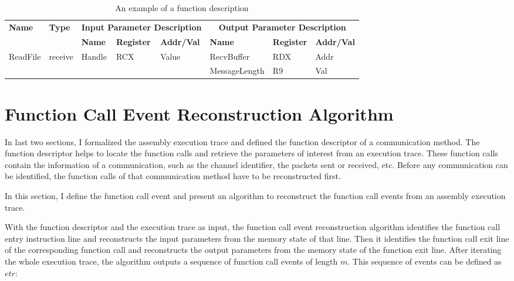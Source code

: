 \begin{table}[H]
        \centering
        \caption{An example of a function description}
        \label{functionexample}
        \begin{tabular}{|l|l|l|l|l|l|l|l|}
            \hline
             \multirow{2}{*}{{\textbf{Name}}} & \multirow{2}{*}{{\textbf{Type}}} & \multicolumn{3}{c|}{\textbf{Input Parameter Description}} & \multicolumn{3}{c|}{\textbf{Output Parameter Description}} \\
              \cline{3-8} 
             & & \textbf{Name}& \textbf{Register} &  \textbf{Addr/Val} & \textbf{Name}& \textbf{Register} &  \textbf{Addr/Val}  \\
             \hline
             \multirow{2}{*}{ReadFile}
             &\multirow{2}{*}{receive} &  \multirow{2}{*}{Handle} & \multirow{2}{*}{RCX} & \multirow{2}{*}{Value} & RecvBuffer & RDX  & Addr\\
              \cline{6-8} 
             & & & & & MessageLength & R9  & Val\\
            \hline            
        \end{tabular}
    \end{table}

\section{Function Call Event Reconstruction Algorithm}
In last two sections, I formalized the assembly execution trace and defined the function descriptor of a communication method. The function descriptor helps to locate the function calls and retrieve the parameters of interest from an execution trace. These function calls contain the information of a communication, such as the channel identifier, the packets sent or received, etc. Before any communication can be identified, the function calls of that communication method have to be reconstructed first. 

In this section, I define the function call event and present an algorithm to reconstruct the function call events from an assembly execution trace. 

With the function descriptor and the execution trace as input, the function call event reconstruction algorithm identifies the function call entry instruction line and reconstructs the input parameters from the memory state of that line. Then it identifies the function call exit line of the corresponding function call and reconstructs the output parameters from the memory state of the function exit line. After iterating the whole execution trace, the algorithm outputs a sequence of function call events of length $m$. This sequence of events can be defined as $etr$:

